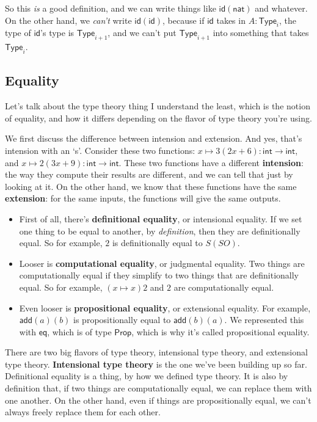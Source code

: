 \documentclass[11pt,paper=letter]{scrartcl}
\newcommand{\sf}{\mathsf}
\newcommand{\prop}{\mathsf{Prop}}
\newcommand{\type}{\mathsf{Type}}
\begin{document}
So this \emph{is} a good definition, and we can write things like $\sf{id}(\sf{nat})$ and whatever. On the other hand, we \emph{can't} write $\sf{id}(\sf{id})$, because if $\sf{id}$ takes in $A : \type_i$, the type of $\sf{id}$'s type is $\type_{i+1}$, and we can't put $\type_{i+1}$ into something that takes $\type_i$.

\subsection{Equality}

Let's talk about the type theory thing I understand the least, which is the notion of equality, and how it differs depending on the flavor of type theory you're using.

We first discuss the difference between intension and extension. And yes, that's intension with an `s'. Consider these two functions: $x \mapsto 3(2x + 6) : \sf{int} \to \sf{int}$, and $x \mapsto 2(3x + 9) : \sf{int} \to \sf{int}$. These two functions have a different \textbf{intension}: the way they compute their results are different, and we can tell that just by looking at it. On the other hand, we know that these functions have the same \textbf{extension}: for the same inputs, the functions will give the same outputs.

\begin{itemize}
\item First of all, there's \textbf{definitional equality}, or intensional equality. If we set one thing to be equal to another, by \emph{definition}, then they are definitionally equal. So for example, $2$ is definitionally equal to $S(SO)$.

\item Looser is \textbf{computational equality}, or judgmental equality. Two things are computationally equal if they simplify to two things that are definitionally equal. So for example, $(x \mapsto x)2$ and $2$ are computationally equal.

\item Even looser is \textbf{propositional equality}, or extensional equality. For example, $\sf{add}(a)(b)$ is propositionally equal to $\sf{add}(b)(a)$. We represented this with $\sf{eq}$, which is of type $\prop$, which is why it's called propositional equality.
\end{itemize}

There are two big flavors of type theory, intensional type theory, and extensional type theory. \textbf{Intensional type theory} is the one we've been building up so far. Definitional equality is a thing, by how we defined type theory. It is also by definition that, if two things are computationally equal, we can replace them with one another. On the other hand, even if things are propositionally equal, we can't always freely replace them for each other.
\end{document}
